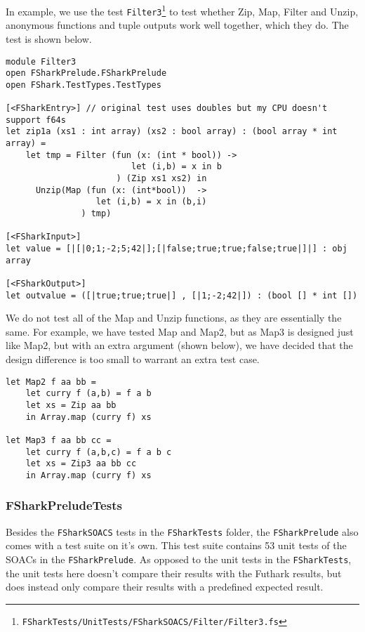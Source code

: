 In example, we use the test \texttt{Filter3}\footnote{\texttt{FSharkTests/UnitTests/FSharkSOACS/Filter/Filter3.fs}} to test whether
Zip, Map, Filter and Unzip, anonymous functions and tuple outputs work well
together, which they do. The test is shown below.
\begin{verbatim}
module Filter3
open FSharkPrelude.FSharkPrelude
open FShark.TestTypes.TestTypes

[<FSharkEntry>] // original test uses doubles but my CPU doesn't support f64s
let zip1a (xs1 : int array) (xs2 : bool array) : (bool array * int array) =
    let tmp = Filter (fun (x: (int * bool)) ->
                         let (i,b) = x in b
                      ) (Zip xs1 xs2) in
      Unzip(Map (fun (x: (int*bool))  ->
                  let (i,b) = x in (b,i)
               ) tmp)

[<FSharkInput>]
let value = [|[|0;1;-2;5;42|];[|false;true;true;false;true|]|] : obj array

[<FSharkOutput>]
let outvalue = ([|true;true;true|] , [|1;-2;42|]) : (bool [] * int [])
\end{verbatim}

We do not test all of the Map and Unzip functions, as they are essentially
the same.
For example, we have tested Map and Map2, but as Map3 is designed just
like Map2, but with an extra argument (shown below), we have decided that the
design difference is too small to warrant an extra test case.

\begin{verbatim}
let Map2 f aa bb =
    let curry f (a,b) = f a b 
    let xs = Zip aa bb
    in Array.map (curry f) xs

let Map3 f aa bb cc =
    let curry f (a,b,c) = f a b c
    let xs = Zip3 aa bb cc
    in Array.map (curry f) xs
\end{verbatim}

\subsubsection{FSharkPreludeTests}
Besides the \texttt{FSharkSOACS} tests in the \texttt{FSharkTests} folder, the
\texttt{FSharkPrelude} also comes with a test suite on it's own.
This test suite contains 53 unit tests of the SOACs in the
\texttt{FSharkPrelude}.
As opposed to the unit tests in the \texttt{FSharkTests}, the unit tests here
doesn't compare their results with the Futhark results, but does instead only
compare their results with a predefined expected result.

